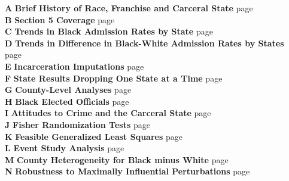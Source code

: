 \documentclass[12pt]{article}
\begin{document}
\noindent \textbf{A} \hspace*{.186in} \textbf{Brief History of Race, Franchise and Carceral State} \dotfill page~\pageref{appendix_history}\\
\noindent \textbf{B} \hspace*{.2in} \textbf{Section 5 Coverage} \dotfill page~\pageref{appendix_coverage}\\
\noindent \textbf{C} \hspace*{.2in} \textbf{Trends in Black Admission Rates by State} \dotfill page~\pageref{appendix_Black_rates_states}\\
\noindent \textbf{D} \hspace*{.197in} \textbf{Trends in Difference in Black-White Admission Rates by States}  \dotfill page~\pageref{appendix_diff_rates_states}\\
\noindent \textbf{E} \hspace*{.22in} \textbf{Incarceration Imputations}  \dotfill page~\pageref{appendix_imputations}\\
\noindent \textbf{F} \hspace*{.24in} \textbf{State Results Dropping One State at a Time}  \dotfill page~\pageref{appendix_jackknife}\\
\noindent \textbf{G} \hspace*{.2in} \textbf{County-Level Analyses}  \dotfill page~\pageref{appendix_county}\\
\noindent \textbf{H} \hspace*{.2in} \textbf{Black Elected Officials}  \dotfill page~\pageref{appendix_beo}\\
\noindent \textbf{I} \hspace*{.26in} \textbf{Attitudes to Crime and the Carceral State}  \dotfill page~\pageref{appendix_attitudes}\\
\noindent \textbf{J} \hspace*{.25in} \textbf{Fisher Randomization Tests}  \dotfill page~\pageref{appendix_fisher}\\
\noindent \textbf{K} \hspace*{.2in} \textbf{Feasible Generalized Least Squares}  \dotfill page~\pageref{appendix_fgls}\\
\noindent \textbf{L} \hspace*{.24in} \textbf{Event Study Analysis}  \dotfill page~\pageref{appendix_eventstudy}\\
\noindent \textbf{M} \hspace*{.188in} \textbf{County Heterogeneity for Black minus White}  \dotfill page~\pageref{appendix_countyheterogeneity_blackminuswhite}\\
\noindent \textbf{N} \hspace*{.215in} \textbf{Robustness to Maximally Influential Perturbations}  \dotfill page~\pageref{appendix_broderick}\\
\end{document}

